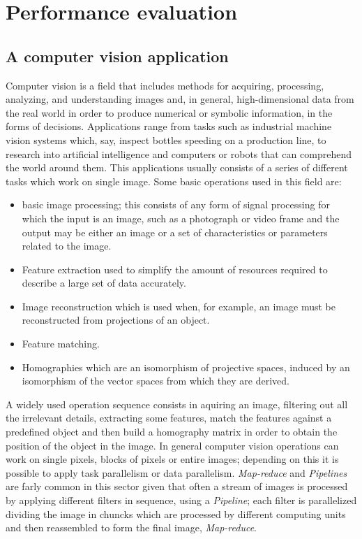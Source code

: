 \documentclass[a4paper,12pt,oneside]{book}
\begin{document}
\chapter{Performance evaluation}
\section{A computer vision application}

Computer vision is a field that includes methods for acquiring, processing, analyzing, and understanding images and, in general, high-dimensional data from the real world in order to produce numerical or symbolic information, in the forms of decisions. Applications range from tasks such as industrial machine vision systems which, say, inspect bottles speeding on a production line, to research into artificial intelligence and computers or robots that can comprehend the world around them. This applications usually consists of a series of different tasks which work on single image. Some basic operations used in this field are:
\begin{itemize}
\item{basic image processing; this consists of any form of signal processing for which the input is an image, such as a photograph or video frame and the output may be either an image or a set of characteristics or parameters related to the image.}
\item{Feature extraction used to simplify the amount of resources required to describe a large set of data accurately.}
\item{Image reconstruction which is used when, for example, an image must be reconstructed from projections of an object.}
\item{Feature matching.}
\item{Homographies which are an isomorphism of projective spaces, induced by an isomorphism of the vector spaces from which they are derived.}
\end{itemize}

A widely used operation sequence consists in aquiring an image, filtering out all the irrelevant details, extracting some features, match the features against a predefined object and then build a homography matrix in order to obtain the position of the object in the image. In general computer vision operations can work on single pixels, blocks of pixels or entire images; depending on this it is possible to apply task parallelism or data parallelism. \emph{Map-reduce} and \emph{Pipelines} are farly common in this sector given that often a stream of images is processed by applying different filters in sequence, using a \emph{Pipeline}; each filter is parallelized dividing the image in chuncks which are processed by different computing units and then reassembled to form the final image, \emph{Map-reduce}.
\end{document}
